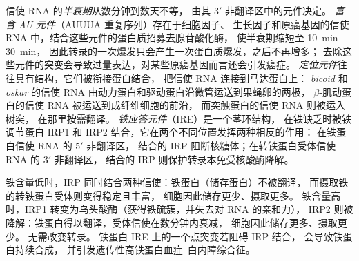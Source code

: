 \begin{definition}\label{def:b3:rna-regulation:stability}
信使 RNA 的\emph{半衰期}从数分钟到数天不等，
由其 3$'$ 非翻译区中的元件决定。
\emph{富含 AU 元件}（AUUUA 重复序列）存在于细胞因子、
生长因子和原癌基因的信使 RNA 中，结合这些元件的蛋白质招募去腺苷酸化酶，
使半衰期缩短至 \qtyrange{10}{30}{min}，
因此转录的一次爆发只会产生一次蛋白质爆发，之后不再增多；
去除这些元件的突变会导致过量表达，对某些原癌基因而言还会引发癌症。
\emph{定位元件}往往具有结构，它们被衔接蛋白结合，
把信使 RNA 连接到马达蛋白上：
\emph{bicoid} 和 \emph{oskar} 的信使 RNA 由动力蛋白和驱动蛋白沿微管运送到果蝇卵的两极，
$\beta$-肌动蛋白的信使 RNA 被运送到成纤维细胞的前沿，
而突触蛋白的信使 RNA 则被运入树突，
在那里按需翻译。
\emph{铁应答元件}（IRE）是一个茎环结构，
在铁缺乏时被铁调节蛋白 IRP1 和 IRP2 结合，它在两个不同位置发挥两种相反的作用：
在铁蛋白信使 RNA 的 5$'$ 非翻译区，
结合的 IRP 阻断核糖体；在转铁蛋白受体信使 RNA 的 3$'$ 非翻译区，
结合的 IRP 则保护转录本免受核酸酶降解。
\end{definition}

\begin{example}[铁，由一个发夹读取]\label{ex:b3:rna-regulation:iron}
铁含量低时，IRP 同时结合两种信使：铁蛋白（储存蛋白）不被翻译，
而摄取铁的转铁蛋白受体则变得稳定且丰富，
细胞因此储存更少、摄取更多。
铁含量高时，IRP1 转变为乌头酸酶（获得铁硫簇，并失去对 RNA 的亲和力），
IRP2 则被降解：铁蛋白得以翻译，受体信使在数分钟内衰减，
细胞因此储存更多、摄取更少。
无需改变转录。
铁蛋白 IRE 上的一个点突变若阻碍 IRP 结合，
会导致铁蛋白持续合成，
并引发遗传性高铁蛋白血症–白内障综合征。
\end{example}

